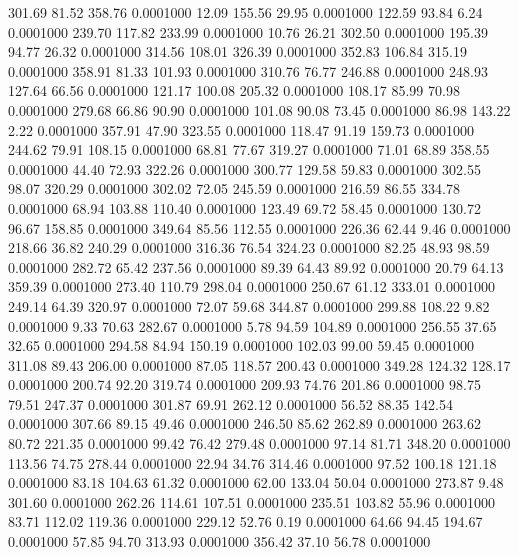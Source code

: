  301.69   81.52  358.76   0.0001000
  12.09  155.56   29.95   0.0001000
 122.59   93.84    6.24   0.0001000
 239.70  117.82  233.99   0.0001000
  10.76   26.21  302.50   0.0001000
 195.39   94.77   26.32   0.0001000
 314.56  108.01  326.39   0.0001000
 352.83  106.84  315.19   0.0001000
 358.91   81.33  101.93   0.0001000
 310.76   76.77  246.88   0.0001000
 248.93  127.64   66.56   0.0001000
 121.17  100.08  205.32   0.0001000
 108.17   85.99   70.98   0.0001000
 279.68   66.86   90.90   0.0001000
 101.08   90.08   73.45   0.0001000
  86.98  143.22    2.22   0.0001000
 357.91   47.90  323.55   0.0001000
 118.47   91.19  159.73   0.0001000
 244.62   79.91  108.15   0.0001000
  68.81   77.67  319.27   0.0001000
  71.01   68.89  358.55   0.0001000
  44.40   72.93  322.26   0.0001000
 300.77  129.58   59.83   0.0001000
 302.55   98.07  320.29   0.0001000
 302.02   72.05  245.59   0.0001000
 216.59   86.55  334.78   0.0001000
  68.94  103.88  110.40   0.0001000
 123.49   69.72   58.45   0.0001000
 130.72   96.67  158.85   0.0001000
 349.64   85.56  112.55   0.0001000
 226.36   62.44    9.46   0.0001000
 218.66   36.82  240.29   0.0001000
 316.36   76.54  324.23   0.0001000
  82.25   48.93   98.59   0.0001000
 282.72   65.42  237.56   0.0001000
  89.39   64.43   89.92   0.0001000
  20.79   64.13  359.39   0.0001000
 273.40  110.79  298.04   0.0001000
 250.67   61.12  333.01   0.0001000
 249.14   64.39  320.97   0.0001000
  72.07   59.68  344.87   0.0001000
 299.88  108.22    9.82   0.0001000
   9.33   70.63  282.67   0.0001000
   5.78   94.59  104.89   0.0001000
 256.55   37.65   32.65   0.0001000
 294.58   84.94  150.19   0.0001000
 102.03   99.00   59.45   0.0001000
 311.08   89.43  206.00   0.0001000
  87.05  118.57  200.43   0.0001000
 349.28  124.32  128.17   0.0001000
 200.74   92.20  319.74   0.0001000
 209.93   74.76  201.86   0.0001000
  98.75   79.51  247.37   0.0001000
 301.87   69.91  262.12   0.0001000
  56.52   88.35  142.54   0.0001000
 307.66   89.15   49.46   0.0001000
 246.50   85.62  262.89   0.0001000
 263.62   80.72  221.35   0.0001000
  99.42   76.42  279.48   0.0001000
  97.14   81.71  348.20   0.0001000
 113.56   74.75  278.44   0.0001000
  22.94   34.76  314.46   0.0001000
  97.52  100.18  121.18   0.0001000
  83.18  104.63   61.32   0.0001000
  62.00  133.04   50.04   0.0001000
 273.87    9.48  301.60   0.0001000
 262.26  114.61  107.51   0.0001000
 235.51  103.82   55.96   0.0001000
  83.71  112.02  119.36   0.0001000
 229.12   52.76    0.19   0.0001000
  64.66   94.45  194.67   0.0001000
  57.85   94.70  313.93   0.0001000
 356.42   37.10   56.78   0.0001000
